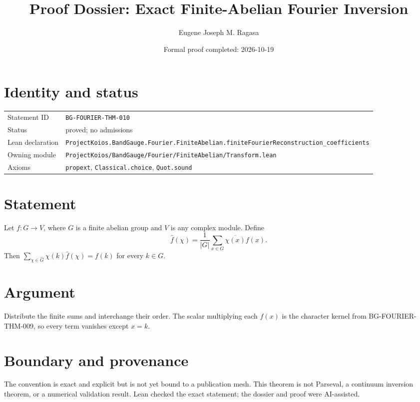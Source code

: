 \documentclass[11pt]{article}
\title{Proof Dossier: Exact Finite-Abelian Fourier Inversion}
\author{Eugene Joseph M. Ragasa}
\date{Formal proof completed: 2026-10-19}
\begin{document}
\maketitle
\section{Identity and status}
\begin{tabularx}{\textwidth}{@{}lX@{}}\toprule
Statement ID & \texttt{BG-FOURIER-THM-010} \\
Status & proved; no admissions \\
Lean declaration & \texttt{ProjectKoios.BandGauge.Fourier.FiniteAbelian.}\newline\texttt{finiteFourierReconstruction\_coefficients} \\
Owning module & \texttt{ProjectKoios/BandGauge/Fourier/FiniteAbelian/Transform.lean} \\
Axioms & \texttt{propext}, \texttt{Classical.choice}, \texttt{Quot.sound} \\
\bottomrule\end{tabularx}
\section{Statement}
Let $f:G\to V$, where $G$ is a finite abelian group and $V$ is any complex module. Define
\[
 \widehat f(\chi)=\frac1{|G|}\sum_{x\in G}\overline{\chi(x)}f(x).
\]
Then $\sum_{\chi\in\widehat G}\chi(k)\widehat f(\chi)=f(k)$ for every $k\in G$.
\section{Argument}
Distribute the finite sums and interchange their order. The scalar multiplying each $f(x)$ is the character kernel from BG-FOURIER-THM-009, so every term vanishes except $x=k$.
\section{Boundary and provenance}
The convention is exact and explicit but is not yet bound to a publication mesh. This theorem is not Parseval, a continuum inversion theorem, or a numerical validation result. Lean checked the exact statement; the dossier and proof were AI-assisted.
\end{document}
